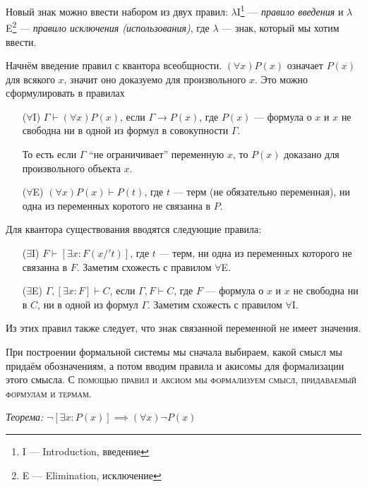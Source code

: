 \newcommand\Aii{$\forall$I}
\newcommand\Aee{$\forall$E}
\newcommand\Eii{$\exists$I}
\newcommand\Eee{$\exists$E}

Новый знак можно ввести набором из двух правил:
$\lambda$I\footnote{I --- Introduction, введение} --- {\it правило введения}
и $\lambda$E\footnote{E --- Elimination, исключение} --- {\it правило
исключения (использования)}, где $\lambda$ --- знак, который мы хотим ввести.

Начнём введение правил с квантора всеобщности. $(\forall x)P(x)$ означает
$P(x)$ для всякого $x$, значит оно доказуемо для произвольного $x$.
Это можно сформулировать в правилах
\begin{enumerate}
	\item[(\Aii{})]{}$\Gamma\vdash(\forall x)P(x)$, если ${\Gamma\to P(x)}$, где
		$P(x)$ --- формула о $x$ и $x$ не свободна ни в одной из формул
		в совокупности $\Gamma$.

		То есть если $\Gamma$ ``не ограничивает'' переменную $x$,
		то $P(x)$ доказано для произвольного объекта $x$.

	\item[(\Aee{})]{}$(\forall x)P(x)\vdash P(t)$, где $t$ --- терм
		(не обязательно переменная), ни одна из переменных коротого не связанна в $P$.
\end{enumerate}

Для квантора существования вводятся следующие правила:
\begin{enumerate}
	\item[(\Eii{})]${F\vdash [\exists x:F(x/'t)]}$, где $t$ --- терм,
		ни одна из переменных которого не связанна в $F$.
		Заметим схожесть с правилом $\forall$E.

	\item[(\Eee{})]${\Gamma, [\exists x:F]\vdash C}$, если $\Gamma, F\vdash C$,
		где $F$ --- формула о $x$ и $x$ не свободна ни в $C$, ни в одной из формул $\Gamma$.
		Заметим схожесть с правилом $\forall$I.
\end{enumerate}

Из этих правил также следует, что знак связанной переменной не имеет значения.

При построении формальной системы мы сначала
выбираем, какой смысл мы придаём обозначениям, а потом вводим
правила и акисомы для формализации этого смысла.
\textsc{С помощью правил и аксиом мы формализуем смысл, придаваемый формулам и термам.}

\vspace{1em}
{\it Теорема:} $\lnot [\exists x:P(x)]\implies  (\forall x)\lnot P(x)$

